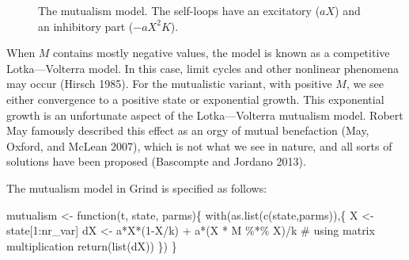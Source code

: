 \documentclass[
  a4paper,
  DIV=11,
  numbers=noendperiod,
  oneside]{scrreprt}
\newenvironment{Shaded}{}{}
\newcommand{\CommentTok}[1]{\textcolor[rgb]{0.42,0.45,0.49}{#1}}
\newcommand{\ControlFlowTok}[1]{\textcolor[rgb]{0.84,0.23,0.29}{#1}}
\newcommand{\DecValTok}[1]{\textcolor[rgb]{0.00,0.36,0.77}{#1}}
\newcommand{\FunctionTok}[1]{\textcolor[rgb]{0.44,0.26,0.76}{#1}}
\newcommand{\NormalTok}[1]{\textcolor[rgb]{0.14,0.16,0.18}{#1}}
\newcommand{\OtherTok}[1]{\textcolor[rgb]{0.44,0.26,0.76}{#1}}
\newcommand{\SpecialCharTok}[1]{\textcolor[rgb]{0.00,0.36,0.77}{#1}}
\begin{document}
\begin{figure}


\caption{\label{fig-ch6-img6-old-75}The mutualism model. The self-loops
have an excitatory (\(aX\)) and an inhibitory part (\(- aX^{2}K\)).}

\end{figure}%

When \(M\) contains mostly negative values, the model is known as a
competitive Lotka---Volterra model. In this case, limit cycles and other
nonlinear phenomena may occur (Hirsch 1985). For the mutualistic
variant, with positive \(M\), we see either convergence to a positive
state or exponential growth. This exponential growth is an unfortunate
aspect of the Lotka---Volterra mutualism model. Robert May famously
described this effect as an orgy of mutual benefaction (May, Oxford, and
McLean 2007), which is not what we see in nature, and all sorts of
solutions have been proposed (Bascompte and Jordano 2013).

The mutualism model in Grind is specified as follows:

\begin{Shaded}
\begin{Highlighting}[]
\NormalTok{mutualism }\OtherTok{\textless{}{-}} \ControlFlowTok{function}\NormalTok{(t, state, parms)\{}
  \FunctionTok{with}\NormalTok{(}\FunctionTok{as.list}\NormalTok{(}\FunctionTok{c}\NormalTok{(state,parms)),\{}
\NormalTok{    X }\OtherTok{\textless{}{-}}\NormalTok{ state[}\DecValTok{1}\SpecialCharTok{:}\NormalTok{nr\_var]}
\NormalTok{    dX }\OtherTok{\textless{}{-}}\NormalTok{ a}\SpecialCharTok{*}\NormalTok{X}\SpecialCharTok{*}\NormalTok{(}\DecValTok{1}\SpecialCharTok{{-}}\NormalTok{X}\SpecialCharTok{/}\NormalTok{k) }\SpecialCharTok{+}\NormalTok{ a}\SpecialCharTok{*}\NormalTok{(X }\SpecialCharTok{*}\NormalTok{ M }\SpecialCharTok{\%*\%}\NormalTok{ X)}\SpecialCharTok{/}\NormalTok{k }\CommentTok{\# using matrix multiplication}
    \FunctionTok{return}\NormalTok{(}\FunctionTok{list}\NormalTok{(dX))}
\NormalTok{  \})}
\NormalTok{\}}
\end{Highlighting}
\end{Shaded}
\end{document}
